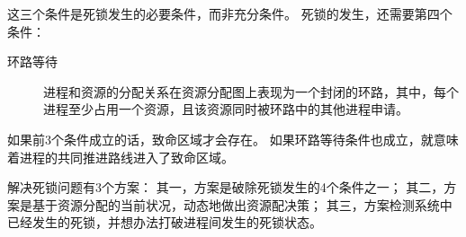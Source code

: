 {{        这三个条件是死锁发生的必要条件，而非充分条件。
        死锁的发生，还需要第四个条件：

        \begin{description}
            \item[环路等待] 进程和资源的分配关系在资源分配图上表现为一个封闭的环路，其中，每个进程至少占用一个资源，且该资源同时被环路中的其他进程申请。
        \end{description}

        如果前3个条件成立的话，致命区域才会存在。
        如果环路等待条件也成立，就意味着进程的共同推进路线进入了致命区域。

        解决死锁问题有3个方案：
        其一，方案是破除死锁发生的4个条件之一；
        其二，方案是基于资源分配的当前状况，动态地做出资源配决策；
        其三，方案检测系统中已经发生的死锁，并想办法打破进程间发生的死锁状态。
    }
}

